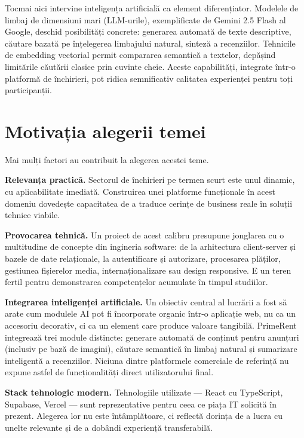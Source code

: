 \documentclass[12pt,a4paper,oneside]{report}
\begin{document}
Tocmai aici intervine inteligența artificială ca element diferențiator. Modelele de limbaj de dimensiuni mari (LLM-urile), exemplificate de Gemini 2.5 Flash al Google, deschid posibilități concrete: generarea automată de texte descriptive, căutare bazată pe înțelegerea limbajului natural, sinteză a recenziilor. Tehnicile de embedding vectorial permit compararea semantică a textelor, depășind limitările căutării clasice prin cuvinte cheie. Aceste capabilități, integrate într-o platformă de închirieri, pot ridica semnificativ calitatea experienței pentru toți participanții.


\section{Motivația alegerii temei}

Mai mulți factori au contribuit la alegerea acestei teme.

\textbf{Relevanța practică.} Sectorul de închirieri pe termen scurt este unul dinamic, cu aplicabilitate imediată. Construirea unei platforme funcționale în acest domeniu dovedește capacitatea de a traduce cerințe de business reale în soluții tehnice viabile.

\textbf{Provocarea tehnică.} Un proiect de acest calibru presupune jonglarea cu o multitudine de concepte din ingineria software: de la arhitectura client-server și bazele de date relaționale, la autentificare și autorizare, procesarea plăților, gestiunea fișierelor media, internaționalizare sau design responsive. E un teren fertil pentru demonstrarea competențelor acumulate în timpul studiilor.

\textbf{Integrarea inteligenței artificiale.} Un obiectiv central al lucrării a fost să arate cum modulele AI pot fi încorporate organic într-o aplicație web, nu ca un accesoriu decorativ, ci ca un element care produce valoare tangibilă. PrimeRent integrează trei module distincte: generare automată de conținut pentru anunțuri (inclusiv pe bază de imagini), căutare semantică în limbaj natural și sumarizare inteligentă a recenziilor. Niciuna dintre platformele comerciale de referință nu expune astfel de funcționalități direct utilizatorului final.

\textbf{Stack tehnologic modern.} Tehnologiile utilizate — React cu TypeScript, Supabase, Vercel — sunt reprezentative pentru ceea ce piața IT solicită în prezent. Alegerea lor nu este întâmplătoare, ci reflectă dorința de a lucra cu unelte relevante și de a dobândi experiență transferabilă.
\end{document}
